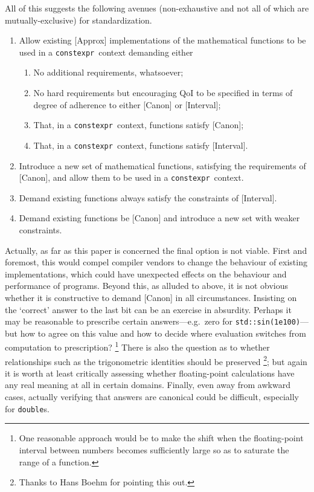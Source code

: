 \documentclass[prd,twocolumn,amsmath,amssymb,nofootinbib,eqsecnum]{revtex4-1}
\newcommand{\constexpr}{\code{constexpr}\xspace}
\newcommand{\code}[1]{{\tt #1}}
\begin{document}
All of this suggests the following avenues (non-exhaustive and not all of which are mutually-exclusive) for standardization.
\begin{enumerate}
	\item Allow existing [Approx] implementations of the mathematical functions to be used in a \constexpr\ context demanding either
	\begin{enumerate}
		\item No additional requirements, whatsoever;
		
		\item No hard requirements but encouraging QoI to be specified in terms of degree
		of adherence to either [Canon] or [Interval];
		\label{approx-with-QoI}
		
		\item That, in a \constexpr\ context, functions satisfy [Canon];
		\label{canon-constexpr}
		
		\item That, in a \constexpr\ context, functions satisfy [Interval].
	\end{enumerate}

	\item Introduce a new set of mathematical functions, satisfying the requirements of [Canon], and
	allow them to be used in a \constexpr\ context.
	\label{canon-new}
	
	\item Demand existing functions always satisfy the constraints of [Interval].
	
	\item Demand existing functions be [Canon] and introduce a new set with weaker constraints.
\end{enumerate}
Actually, as far as this paper is concerned the final option is not viable. First and foremost, this would compel compiler vendors to change the behaviour of existing implementations, which could have unexpected effects on the behaviour and performance of programs. Beyond this, as alluded to above, it is not obvious whether it is constructive to demand [Canon] in all circumstances. Insisting on the `correct' answer to the last bit can be an exercise in absurdity. Perhaps it may be reasonable to prescribe certain answers---e.g.\ zero for \code{std::sin(1e100)}---but how to agree on this value and how to decide where evaluation switches from computation to prescription?%
\footnote{One reasonable approach would be to make the shift when the floating-point interval between numbers becomes sufficiently large so as to saturate the range of a function.
}
 There is also the question as to whether relationships such as the trigonometric identities should be preserved%
\footnote{Thanks to Hans Boehm for pointing this out.}; but again it is worth at least critically assessing whether floating-point calculations have any real meaning at all in certain domains. Finally, even away from awkward cases, actually verifying that answers are canonical could be difficult, especially for \code{double}s.
\end{document}
